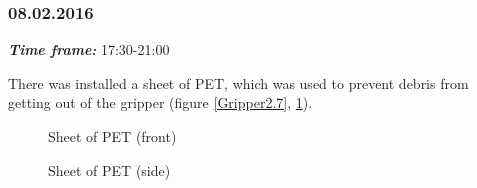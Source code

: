 \subsubsection{08.02.2016 }
\textit{\textbf{Time frame:}} 17:30-21:00 


There was installed a sheet of PET, which was used to prevent debris from getting out of the gripper (figure \ref{Gripper2.7}, \ref{Gripper2.8}).

\begin{figure}[H]
	\begin{minipage}[h]{0.47\linewidth}
		\caption{Sheet of PET (front)}
		\label{Gripper2.7}
	\end{minipage}
	\hfill
	\begin{minipage}[h]{0.47\linewidth}
		\caption{Sheet of PET (side)}
		\label{Gripper2.8}
	\end{minipage}
\end{figure}